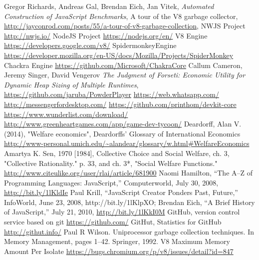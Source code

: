 \documentclass{l4proj}
\begin{document}
\begin{thebibliography}{9}
Gregor Richards, Andreas Gal, Brendan Eich, Jan Vitek,
\emph{Automated Construction of JavaScript Benchmarks},
A tour of the V8 garbage collector,
\url{http://jayconrod.com/posts/55/a-tour-of-v8-garbage-collection},
NWJS Project
\url{http://nwjs.io/}
NodeJS Project
\url{https://nodejs.org/en/}
V8 Engine
\url{https://developers.google.com/v8/}
SpidermonkeyEngine
\url{https://developer.mozilla.org/en-US/docs/Mozilla/Projects/SpiderMonkey}
Chackra Engine
\url{https://github.com/Microsoft/ChakraCore}
Callum Cameron, Jeremy Singer, David Vengerov
\emph{The Judgment of Forseti: Economic Utility for Dynamic Heap Sizing of Multiple Runtimes},
\url{https://github.com/jaruba/PowderPlayer}
\url{https://web.whatsapp.com/}
\url{http://messengerfordesktop.com/}
\url{https://github.com/printhom/devkit-core}
\url{https://www.wunderlist.com/download/}
\url{http://www.greenheartgames.com/app/game-dev-tycoon/}
Deardorff, Alan V. (2014), "Welfare economics", Deardorffs' Glossary of International Economics \url{http://www-personal.umich.edu/~alandear/glossary/w.html#WelfareEconomics}
Amartya K. Sen, 1970 [1984], Collective Choice and Social Welfare, ch. 3, "Collective Rationality." p. 33, and ch. 3*, "Social Welfare Functions." \url{http://www.citeulike.org/user/rlai/article/681900}
Naomi Hamilton, “The A–Z of Programming Languages: JavaScript,” Computerworld, July 30, 2008, \url{http://bit.ly/1lKldIe}
 Paul Krill, “JavaScript Creator Ponders Past, Future,” InfoWorld, June 23, 2008, http://bit.ly/1lKlpXO; Brendan Eich, “A Brief History of JavaScript,” July 21, 2010, \url{http://bit.ly/1lKkI0M}
GitHub, version control service based on git \hspace*{1em} \url{https://github.com/}
GitHut, Statistics for GitHub \hspace*{1em} \url{http://githut.info/}
Paul R Wilson. Uniprocessor garbage collection techniques. In Memory Management, pages 1–42.
Springer, 1992.
V8 Maximum Memory Amount Per Isolate
\url{https://bugs.chromium.org/p/v8/issues/detail?id=847}
\end{thebibliography}
\end{document}
